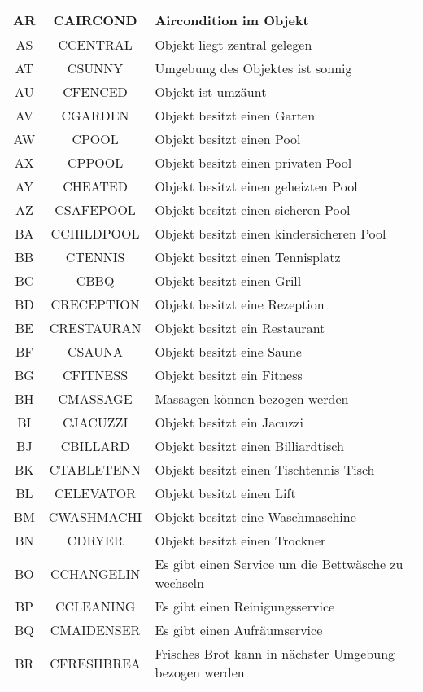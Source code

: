\begin{longtable}{ | c | c | L{10cm} |}
	AR & CAIRCOND & Aircondition im Objekt\\ \hline 
	AS & CCENTRAL & Objekt liegt zentral gelegen \\ \hline 
	AT & CSUNNY & Umgebung des Objektes ist sonnig \\ \hline 
	AU & CFENCED & Objekt ist umzäunt \\ \hline 
	AV & CGARDEN & Objekt besitzt einen Garten \\ \hline 
	AW & CPOOL & Objekt besitzt einen Pool \\ \hline 
	AX & CPPOOL & Objekt besitzt einen privaten Pool \\ \hline 
	AY & CHEATED & Objekt besitzt einen geheizten Pool \\ \hline 
	AZ & CSAFEPOOL & Objekt besitzt einen sicheren Pool \\ \hline 
	BA & CCHILDPOOL & Objekt besitzt einen kindersicheren Pool \\ \hline 
	BB & CTENNIS & Objekt besitzt einen Tennisplatz \\ \hline 
	BC & CBBQ & Objekt besitzt einen Grill \\ \hline 
	BD & CRECEPTION& Objekt besitzt eine Rezeption \\ \hline 
	BE & CRESTAURAN & Objekt besitzt ein Restaurant \\ \hline 
	BF & CSAUNA & Objekt besitzt eine Saune \\ \hline 
	BG & CFITNESS & Objekt besitzt ein Fitness \\ \hline 
	BH & CMASSAGE & Massagen können bezogen werden \\ \hline 
	BI & CJACUZZI& Objekt besitzt ein Jacuzzi \\ \hline 
	BJ & CBILLARD & Objekt besitzt einen Billiardtisch \\ \hline 
	BK & CTABLETENN & Objekt besitzt einen Tischtennis Tisch \\ \hline 
	BL & CELEVATOR & Objekt besitzt einen Lift \\ \hline 
	BM & CWASHMACHI & Objekt besitzt eine Waschmaschine \\ \hline 
	BN & CDRYER & Objekt besitzt einen Trockner \\ \hline 
	BO & CCHANGELIN & Es gibt einen Service um die Bettwäsche zu wechseln \\ \hline 
	BP & CCLEANING & Es gibt einen Reinigungsservice \\ \hline 
	BQ & CMAIDENSER & Es gibt einen Aufräumservice \\ \hline 
	BR & CFRESHBREA & Frisches Brot kann in nächster Umgebung bezogen werden \\ \hline 

\end{longtable}
